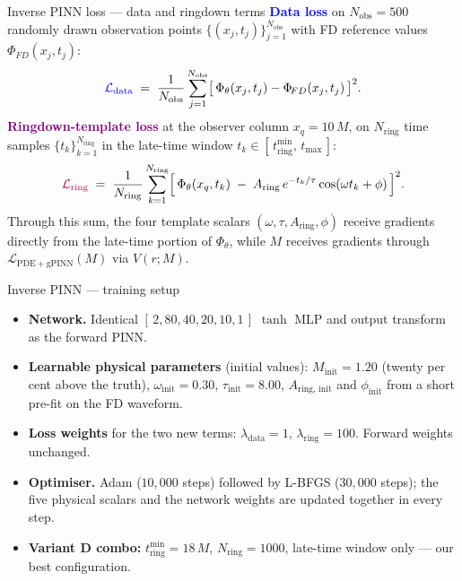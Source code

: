 \documentclass[aspectratio=169, 11pt]{beamer}
\newcommand{\fd}{FD}
\begin{document}
\begin{frame}{Inverse PINN loss --- data and ringdown terms}
  \footnotesize
  \textcolor{blue}{\textbf{Data loss}} on
  $N_{\mathrm{obs}}\!=\!500$ randomly drawn observation points
  $\{(x_{j},t_{j})\}_{j=1}^{N_{\mathrm{obs}}}$ with FD reference values
  $\Phi_{\!\fd{}}(x_{j},t_{j})$:
  \[
    \textcolor{blue}{\mathcal{L}_{\mathrm{data}}}
      \;=\; \frac{1}{N_{\mathrm{obs}}}\sum_{j=1}^{N_{\mathrm{obs}}}
            \bigl[\,\Phi_{\theta}(x_{j},t_{j})
                  -\Phi_{\!\fd{}}(x_{j},t_{j})\,\bigr]^{2}.
  \]
  \medskip
  \textcolor{purple}{\textbf{Ringdown-template loss}} at the observer
  column $x_{q}\!=\!10\,M$, on $N_{\mathrm{ring}}$ time samples
  $\{t_{k}\}_{k=1}^{N_{\mathrm{ring}}}$ in the late-time window
  $t_{k}\in[\,t_{\mathrm{ring}}^{\min},\,t_{\max}\,]$:
  \[
    \textcolor{purple}{\mathcal{L}_{\mathrm{ring}}}
      \;=\; \frac{1}{N_{\mathrm{ring}}}\sum_{k=1}^{N_{\mathrm{ring}}}
            \Bigl[\,\Phi_{\theta}(x_{q},t_{k})
                  \;-\;
                  A_{\mathrm{ring}}\,e^{-t_{k}/\tau}\cos(\omega t_{k}+\phi)\,\Bigr]^{2}.
  \]
  \medskip
  Through this sum, the four template scalars
  $(\omega,\tau,A_{\mathrm{ring}},\phi)$ receive gradients directly from
  the late-time portion of $\Phi_{\theta}$, while $M$ receives gradients
  through $\mathcal{L}_{\mathrm{PDE}+\mathrm{gPINN}}(M)$ via $V(r;M)$.
\end{frame}

\begin{frame}{Inverse PINN --- training setup}
  \begin{itemize}
    \item \textbf{Network.} Identical $[\,2,80,40,20,10,1\,]$ $\tanh$ MLP
          and output transform as the forward PINN.
    \item \textbf{Learnable physical parameters} (initial values):
          $M_{\mathrm{init}}\!=\!1.20$ (twenty per cent above the truth),
          $\omega_{\mathrm{init}}\!=\!0.30$,
          $\tau_{\mathrm{init}}\!=\!8.00$,
          $A_{\mathrm{ring,\,init}}$ and $\phi_{\mathrm{init}}$ from a
          short pre-fit on the FD waveform.
    \item \textbf{Loss weights} for the two new terms:
          $\lambda_{\mathrm{data}}\!=\!1$,
          $\lambda_{\mathrm{ring}}\!=\!100$. Forward weights unchanged.
    \item \textbf{Optimiser.} Adam ($10{,}000$ steps) followed by L-BFGS
          ($30{,}000$ steps); the five physical scalars and the network
          weights are updated together in every step.
    \item \textbf{Variant D combo:}
          $t_{\mathrm{ring}}^{\min}\!=\!18\,M$,
          $N_{\mathrm{ring}}\!=\!1000$, late-time window only ---
          our best configuration.
  \end{itemize}
\end{frame}
\end{document}
